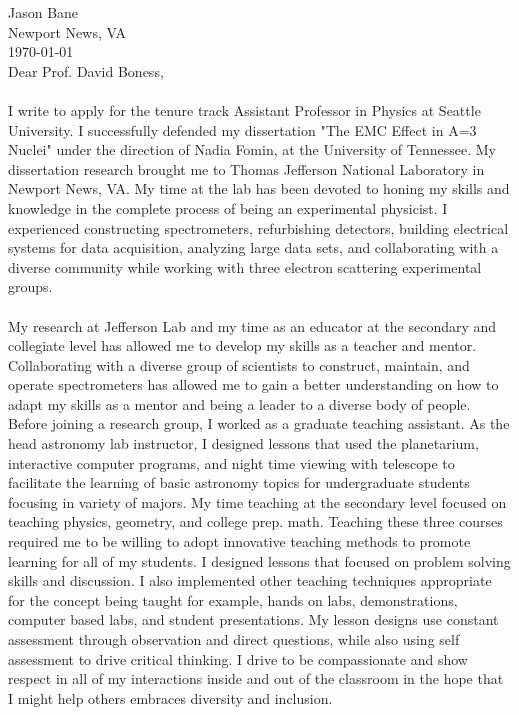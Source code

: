 \documentclass[12pt,letterpaper]{article}
\begin{document}
\vspace*{-1.2cm}
\noindent Jason Bane\\
Newport News, VA \\
\today\\

Dear  Prof. David Boness,

\paragraph{}I write to apply for the tenure track Assistant Professor in Physics at Seattle University. I successfully defended my dissertation "The EMC Effect in A=3 Nuclei" under the direction of Nadia Fomin, at the University of Tennessee. My dissertation research brought me to Thomas Jefferson National Laboratory in Newport News, VA. My time at the lab has been devoted to honing my skills and knowledge in the complete process of being an experimental physicist. I experienced constructing spectrometers, refurbishing detectors, building electrical systems for data acquisition, analyzing large data sets, and collaborating with a diverse community while working with three electron scattering experimental groups.
\paragraph{}My research at Jefferson Lab and my time as an educator at the secondary and collegiate level has allowed me to develop my skills as a teacher and mentor. Collaborating with a diverse group of scientists to construct, maintain, and operate spectrometers has allowed me to gain a better understanding on how to adapt my skills as a mentor and being a leader to a diverse body of people. Before joining a research group, I worked as a graduate teaching assistant. As the head astronomy lab instructor, I designed lessons that used the planetarium, interactive computer programs, and night time viewing with telescope to facilitate the learning of basic astronomy topics for undergraduate students focusing in variety of majors. My time teaching at the secondary level focused on teaching physics, geometry, and  college prep. math. Teaching these three courses required me to be willing to adopt innovative teaching methods to promote learning for all of my students. I designed lessons that focused on problem solving skills and discussion. I also implemented other teaching techniques appropriate for the concept being taught for example, hands on labs, demonstrations, computer based labs, and student presentations. My lesson designs use constant assessment through observation and direct questions, while also using self assessment to drive critical thinking. I drive to be compassionate and show respect in all of my interactions inside and out of the classroom in the hope that I might help others embraces diversity and inclusion. 
\end{document}
